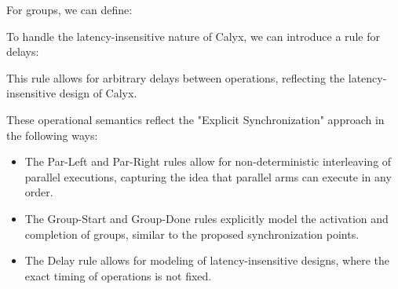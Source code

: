 \documentclass[sigplan,10pt,authorversion,nonacm]{acmart}
\theoremstyle{remark}
\begin{document}
For groups, we can define:

\begin{mathpar}

\end{mathpar}

To handle the latency-insensitive nature of Calyx, we can introduce a rule for delays:

\begin{mathpar}
\end{mathpar}

This rule allows for arbitrary delays between operations, reflecting the latency-insensitive design of Calyx.

These operational semantics reflect the "Explicit Synchronization" approach in the following ways:

\begin{itemize}
  \item The Par-Left and Par-Right rules allow for non-deterministic interleaving of parallel executions, capturing the idea that parallel arms can execute in any order.
  \item The Group-Start and Group-Done rules explicitly model the activation and completion of groups, similar to the proposed synchronization points.
  \item The Delay rule allows for modeling of latency-insensitive designs, where the exact timing of operations is not fixed.
\end{itemize}



  
\end{document}
